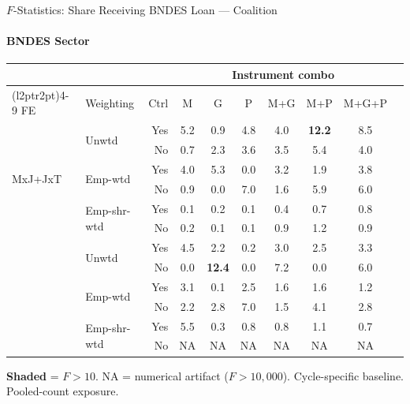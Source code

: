 \documentclass[aspectratio=169,10pt]{beamer}
\newcommand{\fpass}[1]{\cellcolor{pass}\textbf{#1}}
\begin{document}
\begin{frame}[t]{$F$-Statistics: Share Receiving BNDES Loan --- Coalition}
\framesubtitle{BNDES Sector}
\begin{center}
\footnotesize
\setlength{\tabcolsep}{3.5pt}
\renewcommand{\arraystretch}{1.05}
\begin{tabular}{@{}llrccccccc@{}}
\toprule
 & & & \multicolumn{6}{c}{Instrument combo} \\
\cmidrule(l{2pt}r{2pt}){4-9}
FE & Weighting & Ctrl & M & G & P & M+G & M+P & M+G+P \\
\midrule
  \multirow{6}{*}{MxJ+JxT} & \multirow{2}{*}{Unwtd} & Yes & 5.2 & 0.9 & 4.8 & 4.0 & \fpass{12.2} & 8.5 \\
   &  & No & 0.7 & 2.3 & 3.6 & 3.5 & 5.4 & 4.0 \\
   & \multirow{2}{*}{Emp-wtd} & Yes & 4.0 & 5.3 & 0.0 & 3.2 & 1.9 & 3.8 \\
   &  & No & 0.9 & 0.0 & 7.0 & 1.6 & 5.9 & 6.0 \\
   & \multirow{2}{*}{Emp-shr-wtd} & Yes & 0.1 & 0.2 & 0.1 & 0.4 & 0.7 & 0.8 \\
   &  & No & 0.2 & 0.1 & 0.1 & 0.9 & 1.2 & 0.9 \\
\addlinespace[5pt]
  \multirow{6}{*}{MxJ+MxT} & \multirow{2}{*}{Unwtd} & Yes & 4.5 & 2.2 & 0.2 & 3.0 & 2.5 & 3.3 \\
   &  & No & 0.0 & \fpass{12.4} & 0.0 & 7.2 & 0.0 & 6.0 \\
   & \multirow{2}{*}{Emp-wtd} & Yes & 3.1 & 0.1 & 2.5 & 1.6 & 1.6 & 1.2 \\
   &  & No & 2.2 & 2.8 & 7.0 & 1.5 & 4.1 & 2.8 \\
   & \multirow{2}{*}{Emp-shr-wtd} & Yes & 5.5 & 0.3 & 0.8 & 0.8 & 1.1 & 0.7 \\
   &  & No & NA & NA & NA & NA & NA & NA \\
\bottomrule
\end{tabular}
\end{center}
{\scriptsize \colorbox{pass}{\textbf{Shaded}} = $F>10$. NA = numerical artifact ($F>10{,}000$). Cycle-specific baseline. Pooled-count exposure.}
\end{frame}
\end{document}
